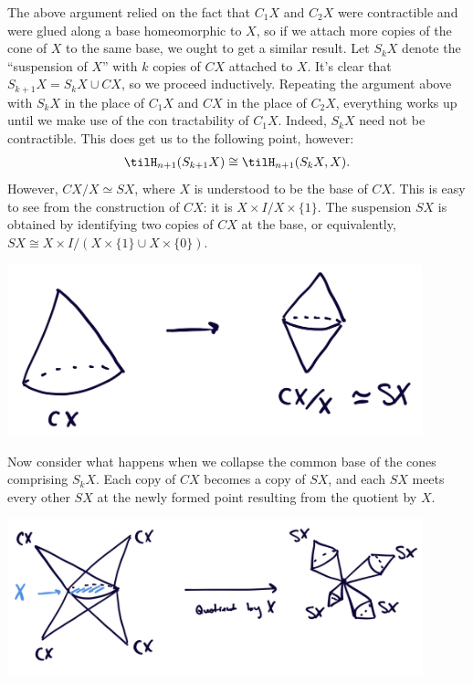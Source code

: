 \begin{homework}[e]
\begin{prf}
    \bigskip

    The above argument relied on the fact that $C_1X$ and $C_2X$ were contractible and were glued along a base homeomorphic to $X$, so if we attach more copies of the cone of $X$ to the same base, we ought to get a similar result. Let $S_kX$ denote the ``suspension of $X$'' with $k$ copies of $CX$ attached to $X$. It's clear that $S_{k+1}X = S_kX \cup CX$, so we proceed inductively. Repeating the argument above with $S_kX$ in the place of $C_1X$ and $CX$ in the place of $C_2X$, everything works up until we make use of the con tractability of $C_1X$. Indeed, $S_kX$ need not be contractible. This does get us to the following point, however:
    \begin{align*}
      \tilH_{n+1}(S_{k+1}X) \cong \tilH_{n+1}(S_kX,X).
    \end{align*}
    However, $CX / X \simeq SX$, where $X$ is understood to be the base of $CX$. This is easy to see from the construction of $CX$: it is $X\times I / X\times \{1\}$. The suspension $SX$ is obtained by identifying two copies of $CX$ at the base, or equivalently, $SX \cong X\times I / (X\times \{1\} \cup X\times \{0\})$.
    \begin{center}
      \includegraphics[width=12cm]{figures/hwk9-fig1.png}
      \label{fig:prob1-1}
    \end{center}
    Now consider what happens when we collapse the common base of the cones comprising $S_{k}X$. Each copy of $CX$ becomes a copy of $SX$, and each $SX$ meets every other $SX$ at the newly formed point resulting from the quotient by $X$.
    \begin{center}
      \includegraphics[width=12cm]{figures/hwk9-fig2.png}

\end{center}
\end{prf}
\end{homework}
